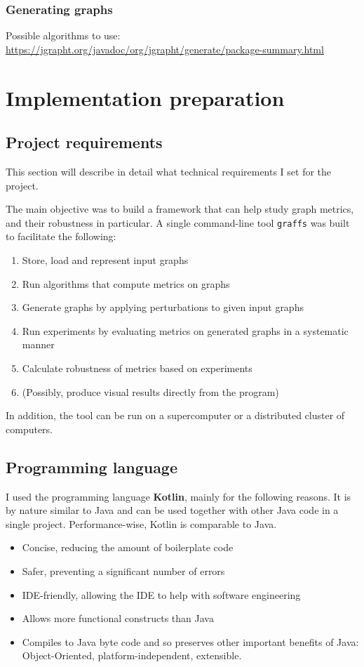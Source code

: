 \subsubsection{Generating graphs}

Possible algorithms to use: \url{https://jgrapht.org/javadoc/org/jgrapht/generate/package-summary.html}


\section{Implementation preparation}

\subsection{Project requirements}

This section will describe in detail what technical requirements I set for the project.

The main objective was to build a framework that can help study graph metrics, and their robustness in particular.
A single command-line tool \texttt{graffs} was built to facilitate the following:

\begin{enumerate}
    \item Store, load and represent input graphs
    \item Run algorithms that compute metrics on graphs
    \item Generate graphs by applying perturbations to given input graphs
    \item Run experiments by evaluating metrics on generated graphs in a systematic manner
    \item Calculate robustness of metrics based on experiments
    \item (Possibly, produce visual results directly from the program)
\end{enumerate}

In addition, the tool can be run on a supercomputer or a distributed cluster of computers.

\subsection{Programming language}

I used the programming language \textbf{Kotlin}, mainly for the following reasons.
It is by nature similar to Java and can be used together with other Java code in a single project.
Performance-wise, Kotlin is comparable to Java.
\begin{itemize}
    \item Concise, reducing the amount of boilerplate code
    \item Safer, preventing a significant number of errors
    \item IDE-friendly, allowing the IDE to help with software engineering
    \item Allows more functional constructs than Java
    \item Compiles to Java byte code and so preserves other important benefits of Java: Object-Oriented, platform-independent, extensible.
\end{itemize}

